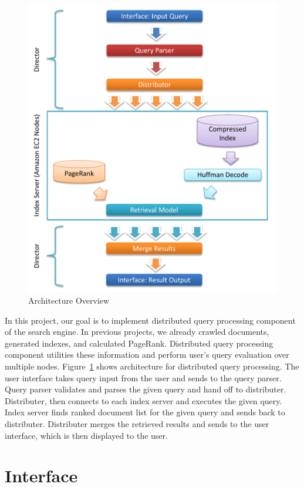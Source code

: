 \documentclass[letterpaper,11pt,twoside]{article}
\begin{document}
\begin{figure}[htbp]
 \centering
 \includegraphics[trim=0.0in 0.00in 0.0in 0.0in, clip, page=1]{Architecture.pdf}
 \caption{Architecture Overview}
 \label{fig:Architecture}
\end{figure}

In this project, our goal is to implement distributed query processing component of the search engine. In previous projects, we already crawled documents, generated indexes, and calculated PageRank. Distributed query processing component utilities these information and perform user's query evaluation over multiple nodes. Figure~\ref{fig:Architecture} shows  architecture for distributed query processing. The user interface takes query input from the user and sends to the query parser. Query parser validates and parses the given query and hand off to distributer. Distributer, then connects to each index server and executes the given query. Index server finds ranked document list for the given query and sends back to distributer. Distributer merges the retrieved results and sends to the user interface, which is then displayed to the user.  

\section{Interface}
\end{document}
